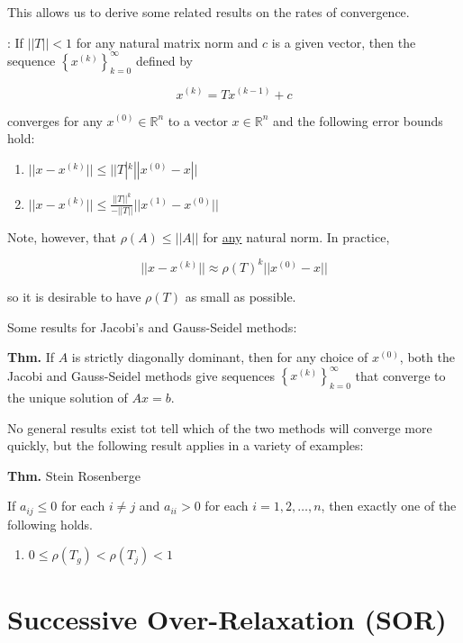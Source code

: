 \documentclass[12pt]{article}
\newcommand{\thm}{\textbf{Thm.}\xspace}
\begin{document}
This allows us to derive some related results on the rates of convergence.

: If $||T||<1$ for any natural matrix norm and $c$ is a given
vector, then the sequence $\left\{ x^{(k)} \right\}_{k=0}^\infty$ defined by

\begin{equation*}
  x^{(k)} = Tx^{(k-1)} + c
\end{equation*}

converges for any $x^{(0)} \in \mathbb{R}^n$ to a vector $x \in \mathbb{R}^n$
and the following error bounds hold:

\begin{enumerate}[label=(\roman*)]
  \item $||x-x^{(k)}||\leq ||T|^k ||x^{(0)}-x||$
  \item $||x-x^{(k)}|| \leq \frac{||T||^k}{-||T||}||x^{(1)}-x^{(0)}||$
\end{enumerate}

Note, however, that $\rho(A) \leq ||A||$ for \uline{any} natural norm. In practice,

\begin{equation*}
  ||x-x^{(k)}|| \approx \rho(T)^k ||x^{(0)}-x||
\end{equation*}

so it is desirable to have $\rho(T)$ as small as possible.

Some results for Jacobi's and Gauss-Seidel methods:

\thm If $A$ is strictly diagonally dominant, then for any choice of $x^{(0)}$,
both the Jacobi and Gauss-Seidel methods give sequences $\left\{ x^{(k)} \right\}_{k=0}^\infty$
that converge to the unique solution of $Ax=b$.

No general results exist tot tell which of the two methods will converge more 
quickly, but the following result applies in a variety of examples:

\thm Stein Rosenberge

If $a_{ij} \leq 0$ for each $i\ne j$ and $a_{ii} >0$ for each $i=1,2,\dots,n$, 
then exactly one of the following holds.

\begin{enumerate}[label=(\alph*)]
\item $0 \leq \rho(T_g) < \rho(T_j) < 1$
\end{enumerate}

\section{Successive Over-Relaxation (SOR)}
\end{document}
